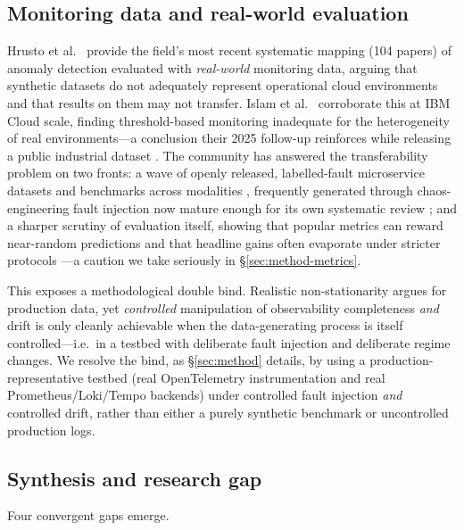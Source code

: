 \documentclass[pdflatex,sn-mathphys-num]{sn-jnl}%
\theoremstyle{thmstyleone}%
\theoremstyle{thmstyletwo}%
\theoremstyle{thmstylethree}%
\begin{document}
\subsection{Monitoring data and real-world evaluation}\label{sec:bg-eval}

Hrusto et al.\ \cite{hrusto2026} provide the field's most recent systematic mapping (104 papers) of anomaly detection evaluated with \emph{real-world} monitoring data, arguing that synthetic datasets do not adequately represent operational cloud environments and that results on them may not transfer. Islam et al.\ \cite{islam2021} corroborate this at IBM Cloud scale, finding threshold-based monitoring inadequate for the heterogeneity of real environments---a conclusion their 2025 follow-up reinforces while releasing a public industrial dataset \cite{islam2025cloud}. The community has answered the transferability problem on two fronts: a wave of openly released, labelled-fault microservice datasets and benchmarks across modalities \cite{bakhtin2025lo2,pham2025rcaeval,ping2026anomod}, frequently generated through chaos-engineering fault injection now mature enough for its own systematic review \cite{owotogbe2026chaos}; and a sharper scrutiny of evaluation itself, showing that popular metrics can reward near-random predictions and that headline gains often evaporate under stricter protocols \cite{sarfraz2024quovadis,wagner2025metrics}---a caution we take seriously in \S\ref{sec:method-metrics}.

This exposes a methodological double bind. Realistic non-stationarity argues for production data, yet \emph{controlled} manipulation of observability completeness \emph{and} drift is only cleanly achievable when the data-generating process is itself controlled---i.e.\ in a testbed with deliberate fault injection and deliberate regime changes. We resolve the bind, as \S\ref{sec:method} details, by using a production-representative testbed (real OpenTelemetry instrumentation and real Prometheus/Loki/Tempo backends) under controlled fault injection \emph{and} controlled drift, rather than either a purely synthetic benchmark or uncontrolled production logs.

\subsection{Synthesis and research gap}\label{sec:bg-gap}

Four convergent gaps emerge.
\end{document}
